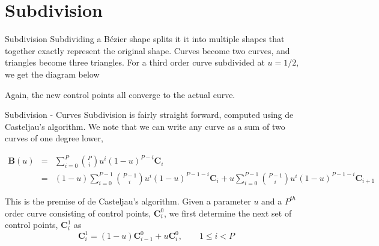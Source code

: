 \documentclass[12pt]{beamer}
\begin{document}
\section{Subdivision}
\begin{frame}{Subdivision}
Subdividing a B{\'e}zier shape splits it it into multiple shapes that together exactly represent the original shape. Curves become two curves, and triangles become three triangles. For a third order curve subdivided at $u = 1/2$, we get the diagram below

\begin{figure}
\centering
{}
\end{figure}
Again, the new control points all converge to the actual curve.
\end{frame}
\begin{frame}{Subdivision - Curves}
Subdivision is fairly straight forward, computed using de Casteljau's algorithm. We note that we can write any curve as a sum of two curves of one degree lower,
{
  \scriptsize

\begin{eqnarray*} \mathbf{B}(u) &=& \sum_{i=0}^P {P \choose i} u^i(1-u)^{P-i}\mathbf{C}_{i} \\ &=& (1-u)\sum_{i=0}^{P-1} {P-1 \choose i} u^i(1-u)^{P-1-i}\mathbf{C}_{i}+u\sum_{i=0}^{P-1} {P-1 \choose i} u^i(1-u)^{P-1-i}\mathbf{C}_{i+1}\end{eqnarray*}
}This is the premise of de Casteljau's algorithm. Given a parameter $u$ and a $P^{th}$ order curve consisting of control points, $\mathbf{C}^{0}_i$, we first determine the next set of control points, $\mathbf{C}^{1}_i$ as
\[
\mathbf{C}^{1}_i = (1-u)\mathbf{C}^{0}_{i-1} + u\mathbf{C}^{0}_i, \qquad  1 \leq i < P
\]

\end{frame}
\end{document}

